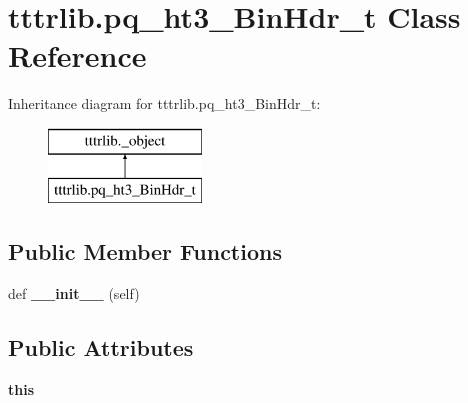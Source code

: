 \hypertarget{classtttrlib_1_1pq__ht3___bin_hdr__t}{}\section{tttrlib.\+pq\+\_\+ht3\+\_\+\+Bin\+Hdr\+\_\+t Class Reference}
\label{classtttrlib_1_1pq__ht3___bin_hdr__t}
Inheritance diagram for tttrlib.\+pq\+\_\+ht3\+\_\+\+Bin\+Hdr\+\_\+t\+:\begin{figure}[H]
\begin{center}
\leavevmode
\includegraphics[height=2.000000cm]{classtttrlib_1_1pq__ht3___bin_hdr__t}
\end{center}
\end{figure}
\subsection*{Public Member Functions}
\begin{DoxyCompactItemize}
\item 
\mbox{\label{classtttrlib_1_1pq__ht3___bin_hdr__t_a374be487171b8ed0ac0e315a498ec2c9}} 
def {\bfseries \+\_\+\+\_\+init\+\_\+\+\_\+} (self)
\end{DoxyCompactItemize}
\subsection*{Public Attributes}
\begin{DoxyCompactItemize}
\item 
\mbox{\label{classtttrlib_1_1pq__ht3___bin_hdr__t_af1743c7b55eaaa6b8c491dd62e0723ad}} 
{\bfseries this}
\end{DoxyCompactItemize}
